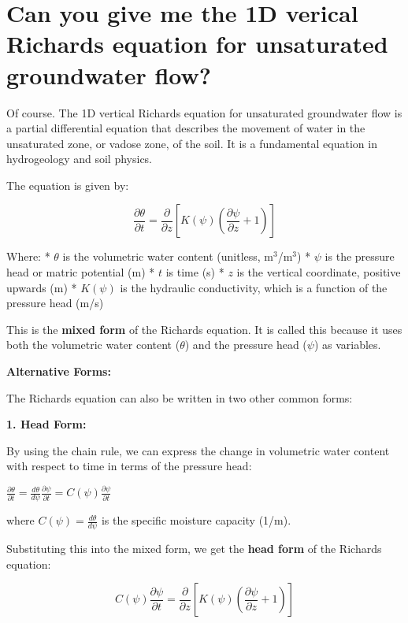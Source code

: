 \documentclass[
]{article}
\author{}
\date{}
\begin{document}
\hypertarget{can-you-give-me-the-1d-verical-richards-equation-for-unsaturated-groundwater-flow}{%
\section{Can you give me the 1D verical Richards equation for
unsaturated groundwater
flow?}\label{can-you-give-me-the-1d-verical-richards-equation-for-unsaturated-groundwater-flow}}

Of course. The 1D vertical Richards equation for unsaturated groundwater
flow is a partial differential equation that describes the movement of
water in the unsaturated zone, or vadose zone, of the soil. It is a
fundamental equation in hydrogeology and soil physics.

The equation is given by:

\[\frac{\partial \theta}{\partial t} = \frac{\partial}{\partial z} \left[ K(\psi) \left( \frac{\partial \psi}{\partial z} + 1 \right) \right]\]

Where: * \(\theta\) is the volumetric water content (unitless,
m\(^3\)/m\(^3\)) * \(\psi\) is the pressure head or matric potential (m)
* \(t\) is time (s) * \(z\) is the vertical coordinate, positive upwards
(m) * \(K(\psi)\) is the hydraulic conductivity, which is a function of
the pressure head (m/s)

This is the \textbf{mixed form} of the Richards equation. It is called
this because it uses both the volumetric water content (\(\theta\)) and
the pressure head (\(\psi\)) as variables.

\textbf{Alternative Forms:}

The Richards equation can also be written in two other common forms:

\textbf{1. Head Form:}

By using the chain rule, we can express the change in volumetric water
content with respect to time in terms of the pressure head:

\(\frac{\partial \theta}{\partial t} = \frac{d\theta}{d\psi} \frac{\partial \psi}{\partial t} = C(\psi) \frac{\partial \psi}{\partial t}\)

where \(C(\psi) = \frac{d\theta}{d\psi}\) is the specific moisture
capacity (1/m).

Substituting this into the mixed form, we get the \textbf{head form} of
the Richards equation:

\[C(\psi) \frac{\partial \psi}{\partial t} = \frac{\partial}{\partial z} \left[ K(\psi) \left( \frac{\partial \psi}{\partial z} + 1 \right) \right]\]
\end{document}
